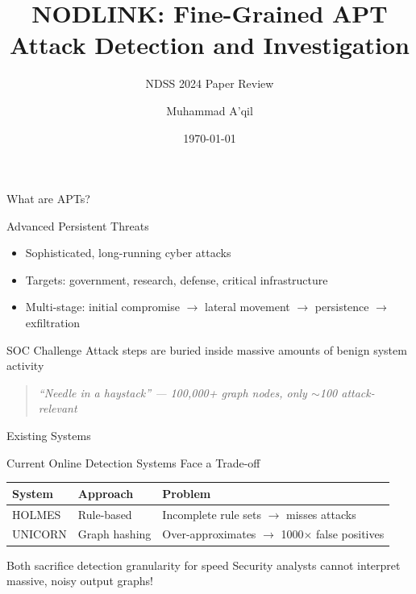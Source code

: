 \documentclass[11pt, aspectratio=169]{beamer}
\title{NODLINK: Fine-Grained APT Attack Detection and Investigation}
\subtitle{NDSS 2024 Paper Review}
\author{Muhammad A'qil}
\date{\today}
\begin{document}
\begin{frame}
    \titlepage
    \centering
\end{frame}

\begin{frame}{What are APTs?}
    \begin{block}{Advanced Persistent Threats}
        \begin{itemize}
            \item Sophisticated, long-running cyber attacks
            \item Targets: government, research, defense, critical infrastructure
            \item Multi-stage: initial compromise $\rightarrow$ lateral movement $\rightarrow$ persistence $\rightarrow$ exfiltration
        \end{itemize}
    \end{block}
    \vspace{0.5cm}
    \begin{alertblock}{SOC Challenge}
        Attack steps are buried inside massive amounts of benign system activity
    \end{alertblock}
    \begin{quote}
        \centering
        \textit{``Needle in a haystack'' — 100,000+ graph nodes, only $\sim$100 attack-relevant}
    \end{quote}
\end{frame}

\begin{frame}{Existing Systems}
    \begin{block}{Current Online Detection Systems Face a Trade-off}
        \begin{table}
        \centering
        \begin{tabular}{lll}
            \toprule
            \textbf{System} & \textbf{Approach} & \textbf{Problem} \\
            \midrule
            HOLMES & Rule-based & Incomplete rule sets $\rightarrow$ misses attacks \\
            UNICORN & Graph hashing & Over-approximates $\rightarrow$ 1000$\times$ false positives \\
            \bottomrule
        \end{tabular}
        \end{table}
    \end{block}
    \begin{alertblock}{Both sacrifice detection granularity for speed}
        Security analysts cannot interpret massive, noisy output graphs!
    \end{alertblock}
\end{frame}
\end{document}
